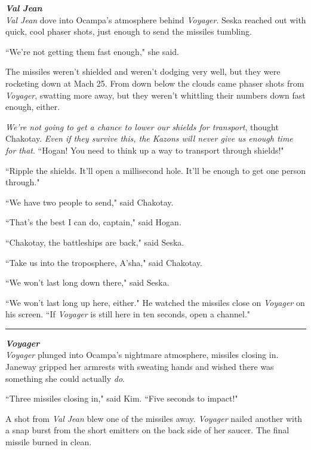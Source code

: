 \documentclass[twoside,letterpaper,12pt]{memoir}
\begin{document}
\noindent\textit{\textbf{Val Jean}}\\

\textit{Val Jean} dove into Ocampa's atmosphere behind \textit{Voyager}. Seska reached out with quick, cool phaser shots, just enough to send the missiles tumbling.

``We're not getting them fast enough," she said.

The missiles weren't shielded and weren't dodging very well, but they were rocketing down at Mach 25. From down below the clouds came phaser shots from \textit{Voyager}, swatting more away, but they weren't whittling their numbers down fast enough, either.

\textit{We're not going to get a chance to lower our shields for transport}, thought Chakotay. \textit{Even if they survive this, the Kazons will never give us enough time for that}. ``Hogan! You need to think up a way to transport through shields!"

``Ripple the shields. It'll open a millisecond hole. It'll be enough to get one person through."

``We have two people to send," said Chakotay.

``That's the best I can do, captain," said Hogan.

``Chakotay, the battleships are back," said Seska.

``Take us into the troposphere, A'sha," said Chakotay.

``We won't last long down there," said Seska.

``We won't last long up here, either." He watched the missiles close on \textit{Voyager} on his screen. ``If \textit{Voyager} is still here in ten seconds, open a channel."

\begin{center}\rule{3cm}{0.4 pt}\end{center}

\noindent\textit{\textbf{Voyager}}\\

\textit{Voyager} plunged into Ocampa's nightmare atmosphere, missiles closing in. Janeway gripped her armrests with sweating hands and wished there was something she could actually \textit{do}.

``Three missiles closing in," said Kim. ``Five seconds to impact!"

A shot from \textit{Val Jean} blew one of the missiles away. \textit{Voyager} nailed another with a snap burst from the short emitters on the back side of her saucer. The final missile burned in clean.
\end{document}

